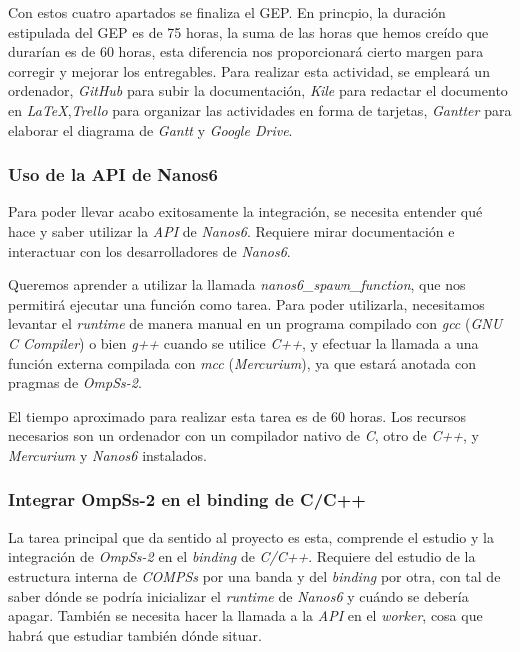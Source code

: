 Con estos cuatro apartados se finaliza el GEP. En princpio, la duración estipulada del GEP es de 75 horas, la suma de las horas que hemos creído que durarían es de 60 horas, esta diferencia nos proporcionará cierto margen para corregir y mejorar los entregables. Para realizar esta actividad, se empleará un ordenador, \textit{GitHub} para subir la documentación, \textit{Kile} para redactar el documento en \textit{LaTeX},\textit{Trello} para organizar las actividades en forma de tarjetas, \textit{Gantter} para elaborar el diagrama de \textit{Gantt} y \textit{Google Drive}.

\subsubsection{Uso de la API de Nanos6}

Para poder llevar acabo exitosamente la integración, se necesita entender qué hace y saber utilizar la \textit{API} de \textit{Nanos6}. Requiere mirar documentación e interactuar con los desarrolladores de \textit{Nanos6}. 
\par\bigskip

Queremos aprender a utilizar la llamada \textit{nanos6\_spawn\_function}, que nos permitirá ejecutar una función como tarea. Para poder utilizarla, necesitamos levantar el \textit{runtime} de manera manual en un programa compilado con \textit{gcc} (\textit{GNU C Compiler}) o bien \textit{g++} cuando se utilice \textit{C++}, y efectuar la llamada a una función externa compilada con \textit{mcc} (\textit{Mercurium}), ya que estará anotada con pragmas de \textit{OmpSs-2}.
\par\bigskip

El tiempo aproximado para realizar esta tarea es de 60 horas. Los recursos necesarios son un ordenador con un compilador nativo de \textit{C}, otro de \textit{C++}, y \textit{Mercurium} y \textit{Nanos6} instalados. 

\subsubsection{Integrar OmpSs-2 en el binding de C/C++}

La tarea principal que da sentido al proyecto es esta, comprende el estudio y la integración de \textit{OmpSs-2} en el \textit{binding} de \textit{C/C++}. Requiere del estudio de la estructura interna de \textit{COMPSs} por una banda y del \textit{binding} por otra, con tal de saber dónde se podría inicializar el \textit{runtime} de \textit{Nanos6} y cuándo se debería apagar. También se necesita hacer la llamada a la \textit{API} en el \textit{worker}, cosa que habrá que estudiar también dónde situar.
\par\bigskip


